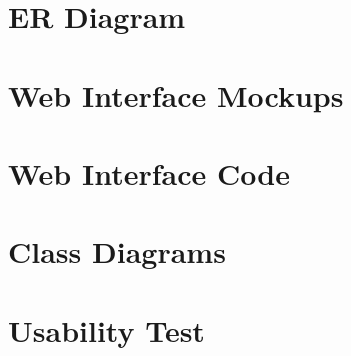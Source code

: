     \section{ER Diagram}
    \label{errDiagram}
      
    \section{Web Interface Mockups}
      
            \label{app:Mock}
    \section{Web Interface Code}
    	
    	      \label{webIHTML}

    \section{Class Diagrams}
    \label{app:Class-diagrams}
      
    
   \section{Usability Test}
      
      \label{app:quest}



\appendix
\listoffigures
\listoftables
\lstlistoflistings


